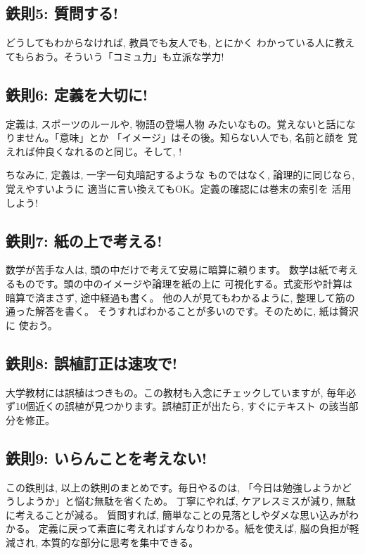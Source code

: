 \subsection*{鉄則5: 質問する!}
どうしてもわからなければ, 教員でも友人でも, とにかく
わかっている人に教えてもらおう。そういう「コミュ力」も立派な学力!\\

\subsection*{鉄則6: 定義を大切に!}
定義は, スポーツのルールや, 物語の登場人物
みたいなもの。覚えないと話になりません。「意味」とか
「イメージ」はその後。知らない人でも, 名前と顔を
覚えれば仲良くなれるのと同じ。そして, !

ちなみに, 定義は, 一字一句丸暗記するような
ものではなく, 論理的に同じなら, 覚えやすいように
適当に言い換えてもOK。定義の確認には巻末の索引を
活用しよう!\\

\subsection*{鉄則7: 紙の上で考える!}
数学が苦手な人は, 頭の中だけで考えて安易に暗算に頼ります。
数学は紙で考えるものです。頭の中のイメージや論理を紙の上に
可視化する。式変形や計算は暗算で済まさず, 途中経過も書く。
他の人が見てもわかるように, 整理して筋の通った解答を書く。
そうすればわかることが多いのです。そのために, 紙は贅沢に
使おう。\\

\subsection*{鉄則8: 誤植訂正は速攻で!}
大学教材には誤植はつきもの。この教材も入念にチェックしていますが, 
毎年必ず10個近くの誤植が見つかります。誤植訂正が出たら, すぐにテキスト
の該当部分を修正。\\

\subsection*{鉄則9: いらんことを考えない!}
この鉄則は, 以上の鉄則のまとめです。毎日やるのは, 
「今日は勉強しようかどうしようか」と悩む無駄を省くため。
丁寧にやれば, ケアレスミスが減り, 無駄に考えることが減る。
質問すれば, 簡単なことの見落としやダメな思い込みがわかる。
定義に戻って素直に考えればすんなりわかる。紙を使えば, 
脳の負担が軽減され, 本質的な部分に思考を集中できる。

